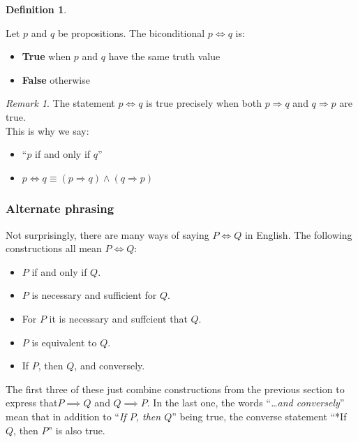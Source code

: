 \documentclass[
]{book}
\providecommand{\tightlist}{%
  \setlength{\itemsep}{0pt}\setlength{\parskip}{0pt}}
\theoremstyle{definition}
\newtheorem{definition}{Definition}[chapter]
\theoremstyle{definition}
\theoremstyle{definition}
\theoremstyle{definition}
\theoremstyle{remark}
\newtheorem*{remark}{Remark}
\begin{document}
\begin{definition}
\protect\hypertarget{def:unnamed-chunk-26}{}\label{def:unnamed-chunk-26}

Let \(p\) and \(q\) be propositions. The biconditional \(p \iff q\) is:

\begin{itemize}
\tightlist
\item
  \textbf{True} when \(p\) and \(q\) have the same truth value\\
\item
  \textbf{False} otherwise
\end{itemize}

\end{definition}

\begin{remark}

The statement \(p \iff q\) is true precisely when both \(p \Rightarrow q\) and \(q \Rightarrow p\) are true.\\
This is why we say:

\begin{itemize}
\tightlist
\item
  ``\(p\) if and only if \(q\)''\\
\item
  \(p \iff q \equiv (p \Rightarrow q) \land (q \Rightarrow p)\)
\end{itemize}

\end{remark}

\subsubsection{Alternate phrasing}\label{alternate-phrasing}

Not surprisingly, there are many ways of saying \(P \iff Q\) in English. The
following constructions all mean \(P \iff Q\):

\begin{itemize}
\tightlist
\item
  \(P\) if and only if \(Q\).
\item
  \(P\) is necessary and sufficient for \(Q\).
\item
  For \(P\) it is necessary and suffcient that \(Q\).
\item
  \(P\) is equivalent to \(Q\).
\item
  If \(P\), then \(Q\), and conversely.
\end{itemize}

The first three of these just combine constructions from the previous section
to express that\(P \implies Q\) and \(Q\implies  P\). In the last one, the words ``\emph{\ldots and conversely}'' mean that in addition to ``\emph{If \(P\), then \(Q\)}'' being true, the converse statement ``*If \(Q\), then \(P\)'' is also true.
\end{document}
